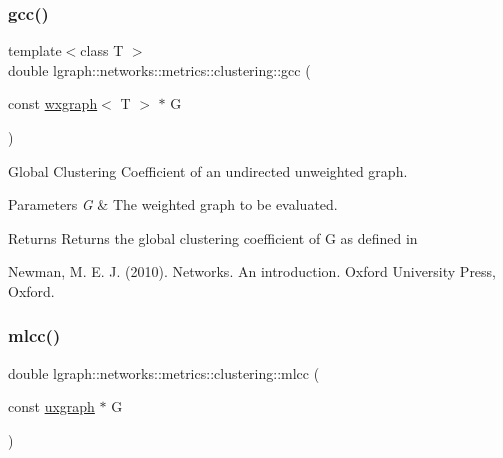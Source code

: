 \subsubsection{\texorpdfstring{gcc()}{gcc()}\hspace{0.1cm}{\footnotesize\ttfamily [2/2]}}
{\footnotesize\ttfamily template$<$class T $>$ \\
double lgraph\+::networks\+::metrics\+::clustering\+::gcc (\begin{DoxyParamCaption}\item[{const \hyperlink{classlgraph_1_1wxgraph}{wxgraph}$<$ T $>$ $\ast$}]{G }\end{DoxyParamCaption})}



Global Clustering Coefficient of an undirected unweighted graph. 


\begin{DoxyParams}{Parameters}
{\em G} & The weighted graph to be evaluated. \\
\hline
\end{DoxyParams}
\begin{DoxyReturn}{Returns}
Returns the global clustering coefficient of G as defined in \begin{DoxyVerb}Newman, M. E. J. (2010). Networks. An introduction. Oxford
University Press, Oxford.
\end{DoxyVerb}
 
\end{DoxyReturn}
\mbox{\label{namespacelgraph_1_1networks_1_1metrics_1_1clustering_ac24aeb5d50fe539b9f0d0cd2f0b8ced2}} 
\subsubsection{\texorpdfstring{mlcc()}{mlcc()}\hspace{0.1cm}{\footnotesize\ttfamily [1/2]}}
{\footnotesize\ttfamily double lgraph\+::networks\+::metrics\+::clustering\+::mlcc (\begin{DoxyParamCaption}\item[{const \hyperlink{classlgraph_1_1uxgraph}{uxgraph} $\ast$}]{G }\end{DoxyParamCaption})}



